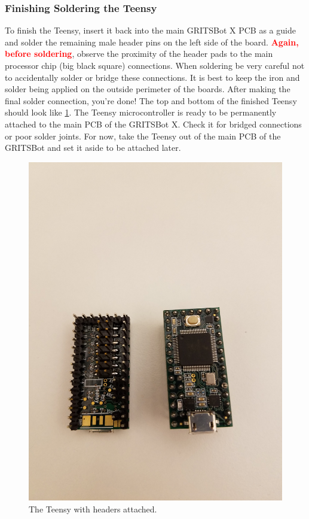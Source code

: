 \subsubsection{Finishing Soldering the Teensy}
\label{sec:teensyFinalSolder}

To finish the Teensy, insert it back into the main GRITSBot X PCB as a guide and solder the remaining male header pins on the left side of the board. \textbf{\textcolor{red}{Again, before soldering}}, observe the proximity of the header pads to the main processor chip (big black square) connections. When soldering be very careful not to accidentally solder or bridge these connections. It is best to keep the iron and solder being applied on the outside perimeter of the boards. After making the final solder connection, you're done! The top and bottom of the finished Teensy should look like \cref{fig:teensyFinished}. The Teensy microcontroller is ready to be permanently attached to the main PCB of the GRITSBot X. Check it for bridged connections or poor solder joints. For now, take the Teensy out of the main PCB of the GRITSBot and set it aside to be attached later.

\begin{figure}[h!]
\centering
\includegraphics[trim={25cm 0 0 0},clip=true,width=0.65\columnwidth, keepaspectratio,angle=270]{./figs/20180912_111949.jpg}
\caption{The Teensy with headers attached.}
\label{fig:teensyFinished}
\end{figure}

